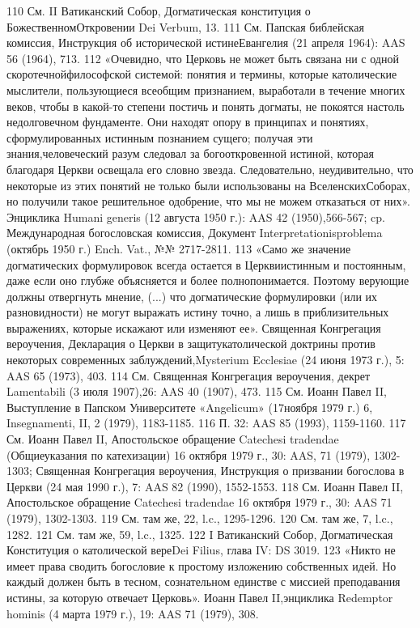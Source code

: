 \documentclass[a5paper,10pt]{article}
\begin{document}
110 См. II Ватиканский Собор, Догматическая конституция о БожественномОткровении Dei Verbum, 13.
111 См. Папская библейская комиссия, Инструкция об исторической истинеЕвангелия (21 апреля 1964): AAS 56 (1964), 713.
112 «Очевидно, что Церковь не может быть связана ни с одной скоротечнойфилософской системой: понятия и термины, которые католические мыслители, пользующиеся всеобщим признанием, выработали в течение многих веков, чтобы в какой-то степени постичь и понять догматы, не покоятся настоль недолговечном фундаменте. Они находят опору в принципах и понятиях, сформулированных истинным познанием сущего; получая эти знания,человеческий разум следовал за богооткровенной истиной, которая благодаря Церкви освещала его словно звезда. Следовательно, неудивительно, что некоторые из этих понятий не только были использованы на ВселенскихСоборах, но получили такое
решительное одобрение, что мы не можем отказаться от них». Энциклика Humani generis (12 августа 1950 г.): AAS 42 (1950),566-567; cp. Международная богословская комиссия, Документ Interpretationisproblema (октябрь 1950 г.) Ench. Vat., №№ 2717-2811.
113 «Само же значение догматических формулировок всегда остается в Церквиистинным и постоянным, даже если оно глубже объясняется и более полнопонимается. Поэтому верующие должны отвергнуть мнение, (...) что догматические формулировки (или их разновидности) не могут выражать истину точно, а лишь в приблизительных выражениях, которые искажают или изменяют ее». Священная Конгрегация вероучения, Декларация о Церкви в защитукатолической доктрины против некоторых современных заблуждений,Mysterium Ecclesiae (24 июня 1973 г.), 5: AAS 65 (1973), 403.
114 См. Священная Конгрегация вероучения, декрет Lamentabili (3 июля 1907),26: AAS 40 (1907), 473.
115 См. Иоанн Павел II, Выступление в Папском Университете «Angelicum» (17ноября 1979 г.) 6, Insegnamenti, II, 2 (1979), 1183-1185.
116 П. 32: AAS 85 (1993), 1159-1160.
117 См. Иоанн Павел II, Апостольское обращение Catechesi tradendae (Общиеуказания по катехизации) 16 октября 1979 г., 30: AAS, 71 (1979), 1302-1303; Священная Конгрегация вероучения, Инструкция о призвании богослова в Церкви (24 мая 1990 г.), 7: AAS 82 (1990), 1552-1553.
118 См. Иоанн Павел II, Апостольское обращение Catechesi tradendae 16 октября 1979 г., 30: AAS 71 (1979), 1302-1303.
119 См. там же, 22, l.c., 1295-1296.
120 См. там же, 7, l.c., 1282.
121 См. там же, 59, l.c., 1325.
122 I Ватиканский Собор, Догматическая Конституция о католической вереDei Filius, глава IV: DS 3019.
123 «Никто не имеет права сводить богословие к простому изложению собственных идей. Но каждый должен быть в тесном, сознательном единстве с миссией преподавания истины, за которую отвечает Церковь». Иоанн Павел II,энциклика Redemptor hominis (4 марта 1979 г.), 19: AAS 71 (1979), 308.
\end{document}
